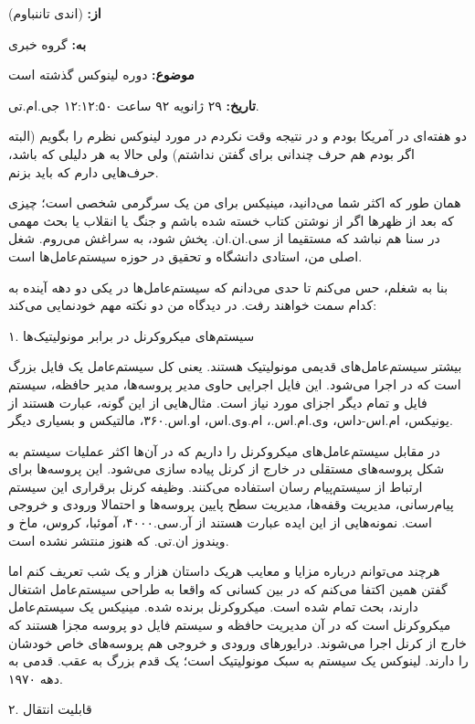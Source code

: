 \begin{emailbox}
\noindent\textbf{از:}  (اندی تاننباوم)

\noindent\textbf{به:} گروه خبری 

\noindent\textbf{موضوع:} دوره لینوکس گذشته است

\noindent\textbf{تاریخ:} ۲۹ ژانویه ۹۲ ساعت ۱۲:۱۲:۵۰ جی.ام.تی.

دو هفته‌ای در آمریکا بودم و در نتیجه وقت نکردم در مورد لینوکس نظرم را
بگویم (البته اگر بودم هم حرف چندانی برای گفتن نداشتم) ولی حالا به هر
دلیلی که باشد، حرف‌هایی دارم که باید بزنم.

همان طور که اکثر شما می‌دانید، مینیکس برای من یک سرگرمی شخصی است؛ چیزی
که بعد از ظهرها اگر از نوشتن کتاب خسته شده باشم و جنگ یا انقلاب یا بحث
مهمی در سنا هم نباشد که مستقیما از سی.ان.ان. پخش شود، به سراغش
می‌روم. شغل اصلی من، استادی دانشگاه و تحقیق در حوزه سیستم‌عامل‌ها است.

بنا به شغلم، حس می‌کنم تا حدی می‌دانم که سیستم‌عامل‌ها در یکی دو دهه آینده
به کدام سمت خواهند رفت. در دیدگاه من دو نکته مهم خودنمایی می‌کند:

\noindent ۱. سیستم‌های میکروکرنل در برابر مونولیتیک‌ها

بیشتر سیستم‌عامل‌های قدیمی مونولیتیک‌ هستند. یعنی کل سیستم‌عامل یک فایل
بزرگ  است که در  اجرا می‌شود. این فایل
اجرایی حاوی مدیر پروسه‌ها، مدیر حافظه، سیستم فایل و تمام دیگر اجزای
مورد نیاز است. مثال‌هایی از این گونه، عبارت هستند از یونیکس، ام.اس-داس،
وی.ام.اس.، ام.وی.اس، او.اس.۳۶۰، مالتیکس و بسیاری دیگر.

در مقابل سیستم‌عامل‌های میکروکرنل را داریم که در آن‌ها اکثر عملیات سیستم
به شکل پروسه‌های مستقلی در خارج از کرنل پیاده سازی می‌شود. این پروسه‌ها
برای ارتباط از سیستم‌پیام رسان استفاده می‌کنند. وظیفه کرنل برقراری این
سیستم پیام‌رسانی، مدیریت وقفه‌ها، مدیریت سطح پایین پروسه‌ها و احتمالا
ورودی و خروجی است. نمونه‌هایی از این ایده عبارت‌ هستند از آر.سی.۴۰۰۰،
آموئبا، کروس، ماخ و ویندوز ان.تی. که هنوز منتشر نشده است.

هرچند می‌توانم درباره مزایا و معایب هریک داستان هزار و یک شب تعریف کنم
اما گفتن همین اکتفا می‌کنم که در بین کسانی که واقعا به طراحی سیستم‌عامل
اشتغال دارند، بحث تمام شده است. میکروکرنل برنده شده. مینیکس یک
سیستم‌عامل میکروکرنل است که در آن مدیریت حافظه و سیستم فایل دو پروسه
مجزا هستند که خارج از کرنل اجرا می‌شوند. درایورهای ورودی و خروجی‌ هم
پروسه‌های خاص خودشان را دارند. لینوکس یک سیستم به سبک مونولیتیک‌ است؛ یک
قدم بزرگ به عقب. قدمی به دهه ۱۹۷۰.

\noindent ۲. قابلیت انتقال


\end{emailbox}
